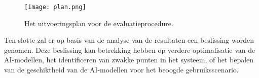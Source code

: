 \begin{figure}[h]
    \centering
    \texttt{[image: plan.png]}
    \captionsetup{justification=centering}
    \caption{Het uitvoeringsplan voor de evaluatieprocedure.}
    \label{fig:plan_methodologie}
\end{figure}


Ten slotte zal er op basis van de analyse van de resultaten een beslissing worden genomen. Deze beslissing kan betrekking hebben op verdere optimalisatie van de AI-modellen, het identificeren van zwakke punten in het systeem, of het bepalen van de geschiktheid van de AI-modellen voor het beoogde gebruiksscenario.

